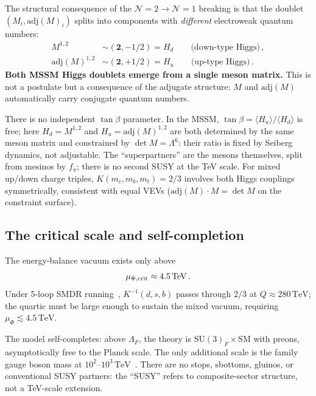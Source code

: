 \documentclass[aps,prd,twocolumn,showpacs,preprintnumbers,superscriptaddress,floatfix]{revtex4-2}
\newcommand{\SU}{\mathrm{SU}}
\newcommand{\adj}{\mathrm{adj}}
\newcommand{\TeV}{\,\mathrm{TeV}}
\begin{document}
The structural consequence of the
$\mathcal{N}{=}2 \to \mathcal{N}{=}1$ breaking is that the
doublet $(M_i, \adj(M)_i)$ splits into components with
\emph{different} electroweak quantum numbers:
\begin{align}
  M^{1,2} &\sim (\mathbf{2}, -1/2) = H_d
    \qquad\text{(down-type Higgs)}\,,\\
  \adj(M)^{1,2} &\sim (\mathbf{2}, +1/2) = H_u
    \qquad\text{(up-type Higgs)}\,.
\end{align}
\textbf{Both MSSM Higgs doublets emerge from a single meson
matrix.}
This is not a postulate but a consequence of the adjugate
structure: $M$ and $\adj(M)$ automatically carry conjugate
quantum numbers.

There is no independent $\tan\beta$ parameter.
In the MSSM, $\tan\beta = \langle H_u\rangle/\langle H_d\rangle$
is free; here $H_d = M^{1,2}$ and $H_u = \adj(M)^{1,2}$ are both
determined by the same meson matrix and constrained by
$\det M = \Lambda^6$: their ratio is fixed by Seiberg dynamics,
not adjustable.
The ``superpartners'' are the mesons themselves, split from
mesinos by $f_\pi$; there is no second SUSY at the TeV scale.
For mixed up/down charge triples, $K(m_c, m_b, m_t) = 2/3$
involves both Higgs couplings symmetrically, consistent with
equal VEVs ($\adj(M) \cdot M = \det M$ on the constraint
surface).


\subsection{The critical scale and self-completion}

The energy-balance vacuum exists only above
\begin{equation}
  \mu_{\Phi,\rm crit} \approx 4.5\TeV\,.
  \label{eq:mucrit}
\end{equation}
Under 5-loop SMDR running~\cite{MartinRobertson:2019,PDG:2024}, $K^{-1}(d,s,b)$
passes through $2/3$ at $Q \approx 280\TeV$; the quartic must be
large enough to sustain the mixed vacuum, requiring
$\mu_\Phi \lesssim 4.5\TeV$.

The model self-completes: above $\Lambda_F$, the theory is
$\SU(3)_F \times \text{SM}$ with preons, asymptotically free
to the Planck scale.
The only additional scale is the family gauge boson mass at
$10^2$--$10^3\TeV$~\cite{Sumino:2009}.
There are no stops, sbottoms, gluinos, or conventional SUSY
partners: the ``SUSY'' refers to composite-sector structure,
not a TeV-scale extension.


\end{document}
